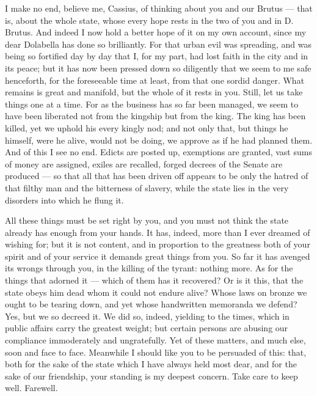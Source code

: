 

 I make no end, believe me, Cassius, of thinking about you and our Brutus --- that is, about the whole state, whose every hope rests in the two of you and in D. Brutus. And indeed I now hold a better hope of it on my own account, since my dear Dolabella has done so brilliantly. For that urban evil was spreading, and was being so fortified day by day that I, for my part, had lost faith in the city and in its peace; but it has now been pressed down so diligently that we seem to me safe henceforth, for the foreseeable time at least, from that one sordid danger. What remains is great and manifold, but the whole of it rests in you. Still, let us take things one at a time. For as the business has so far been managed, we seem to have been liberated not from the kingship but from the king. The king has been killed, yet we uphold his every kingly nod; and not only that, but things he himself, were he alive, would not be doing, we approve as if he had planned them. And of this I see no end. Edicts are posted up, exemptions are granted, vast sums of money are assigned, exiles are recalled, forged decrees of the Senate are produced --- so that all that has been driven off appears to be only the hatred of that filthy man and the bitterness of slavery, while the state lies in the very disorders into which he flung it.

 All these things must be set right by you, and you must not think the state already has enough from your hands. It has, indeed, more than I ever dreamed of wishing for; but it is not content, and in proportion to the greatness both of your spirit and of your service it demands great things from you. So far it has avenged its wrongs through you, in the killing of the tyrant: nothing more. As for the things that adorned it --- which of them has it recovered? Or is it this, that the state obeys him dead whom it could not endure alive? Whose laws on bronze we ought to be tearing down, and yet whose handwritten memoranda we defend? Yes, but we so decreed it. We did so, indeed, yielding to the times, which in public affairs carry the greatest weight; but certain persons are abusing our compliance immoderately and ungratefully. Yet of these matters, and much else, soon and face to face. Meanwhile I should like you to be persuaded of this: that, both for the sake of the state which I have always held most dear, and for the sake of our friendship, your standing is my deepest concern. Take care to keep well. Farewell.

